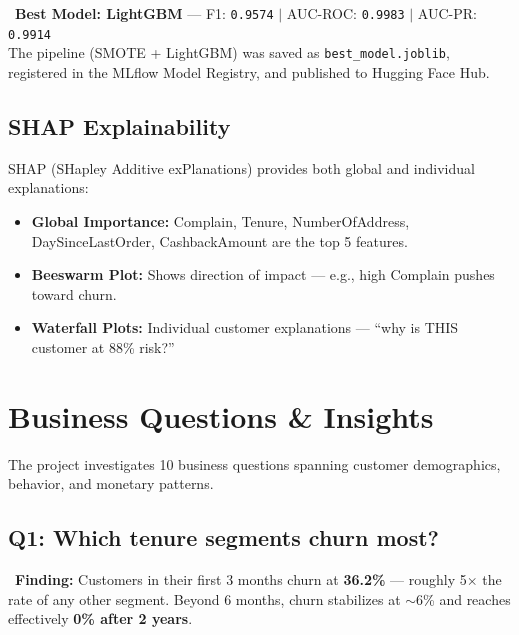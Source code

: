 \documentclass[11pt,a4paper]{article}
\newcommand{\tech}[1]{\texttt{\small\color{primarydark}#1}}
\begin{document}
\begin{infobox}
\faTrophy\ \textbf{Best Model: LightGBM} --- F1: \texttt{0.9574} $|$ AUC-ROC: \texttt{0.9983} $|$ AUC-PR: \texttt{0.9914}\\[0.2cm]
The pipeline (SMOTE + LightGBM) was saved as \tech{best\_model.joblib}, registered in the MLflow Model Registry, and published to Hugging Face Hub.
\end{infobox}

\subsection{SHAP Explainability}

SHAP (SHapley Additive exPlanations) provides both global and individual explanations:

\begin{itemize}[leftmargin=*, label=\textcolor{primary}{\faChartBar}]
    \item \textbf{Global Importance:} Complain, Tenure, NumberOfAddress, DaySinceLastOrder, CashbackAmount are the top 5 features.
    \item \textbf{Beeswarm Plot:} Shows direction of impact --- e.g., high Complain pushes toward churn.
    \item \textbf{Waterfall Plots:} Individual customer explanations --- ``why is THIS customer at 88\% risk?''
\end{itemize}

\section{Business Questions \& Insights}

The project investigates 10 business questions spanning customer demographics, behavior, and monetary patterns.

\subsection{Q1: Which tenure segments churn most?}

\begin{findingbox}
\faSearch\ \textbf{Finding:} Customers in their first 3 months churn at \textbf{36.2\%} --- roughly 5$\times$ the rate of any other segment. Beyond 6 months, churn stabilizes at $\sim$6\% and reaches effectively \textbf{0\% after 2 years}.
\end{findingbox}
\end{document}
